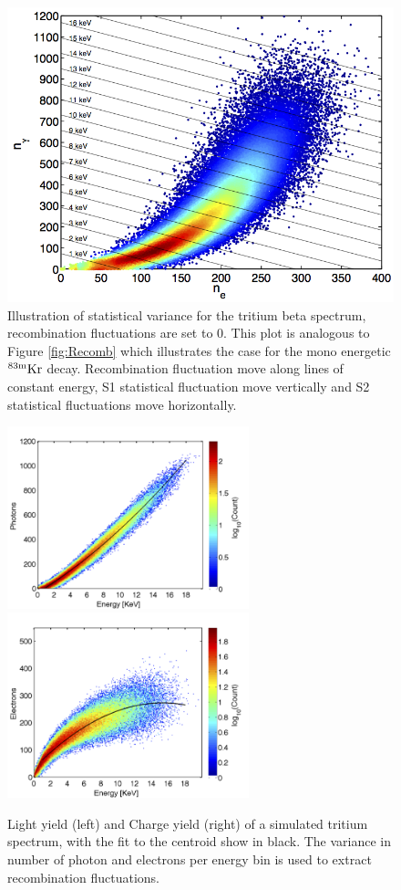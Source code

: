 \begin{figure}[h!]\centering
\includegraphics[width=130mm]{Chapter_Flucs/Figures/EX_T_Fano.png}
\caption{Illustration of statistical variance for the tritium beta spectrum, recombination fluctuations are set to 0. This plot is analogous to Figure \ref{fig:Recomb} which illustrates the case for the mono energetic $\rm ^{83m}Kr$ decay. Recombination fluctuation move along lines of constant energy, S1 statistical fluctuation move vertically and S2 statistical fluctuations move horizontally. }
\label{fig:T_Stat}
\end{figure}

\begin{figure}[h!]\centering
\includegraphics[width=70mm]{Chapter_Flucs/Figures/T_SIM/n_photon_180_.png}
\includegraphics[width=70mm]{Chapter_Flucs/Figures/T_SIM/n_e_180_.png}
\caption{Light yield (left) and Charge yield (right) of a simulated tritium spectrum, with the fit to the centroid show in black. The variance in number of photon and electrons per energy bin is used to extract recombination fluctuations.}
\label{fig:SIM_LYQY}
\end{figure}


